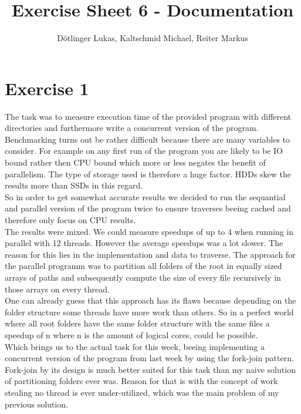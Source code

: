 \documentclass{article}
\title{Exercise Sheet 6 - Documentation}
\date{}
\author{Dötlinger Lukas, Kaltschmid Michael, Reiter Markus}
\begin{document}
  \RaggedRight

  \maketitle

  \section{Exercise 1}
    The task was to measure execution time of the provided program with different directories and furthermore write a concurrent version of the program.
    \\[3pt]
    Benchmarking turns out be rather difficult because there are many variables to consider. For example on any first run of the program you are likely to be IO bound rather then CPU bound which more or less negates the benefit of parallelism. The type of storage used is therefore a huge factor. HDDs skew the results more than SSDs in this regard.
    \\[3pt]
    So in order to get somewhat accurate results we decided to run the sequantial and parallel version of the program twice to ensure traverses beeing cached and therefore only focus on CPU results.
    \\[3pt]
    The results were mixed. We could measure speedups of up to 4 when running in parallel with 12 threads. However the average speedups was a lot slower. The reason for this lies in the implementation and data to traverse. The approach for the parallel programm was to partition all folders of the root in equally sized arrays of paths and subsequently compute the size of every file recursively in those arrays on every thread.
    \\[3pt]
    One can already guess that this approach has its flaws because depending on the folder structure some threads have more work than others. So in a perfect world where all root folders have the same folder structure with the same files a speedup of n where n is the amount of logical cores, could be possible.
    \\[3pt]
    Which brings us to the actual task for this week, beeing implementing a concurrent version of the program from last week by using the fork-join pattern. Fork-join by its design is much better suited for this task than my naive solution of partitioning folders ever was. Reason for that is with the concept of work stealing no thread is ever under-utilized, which was the main problem of my previous solution.
    \\[3pt]
\end{document}
